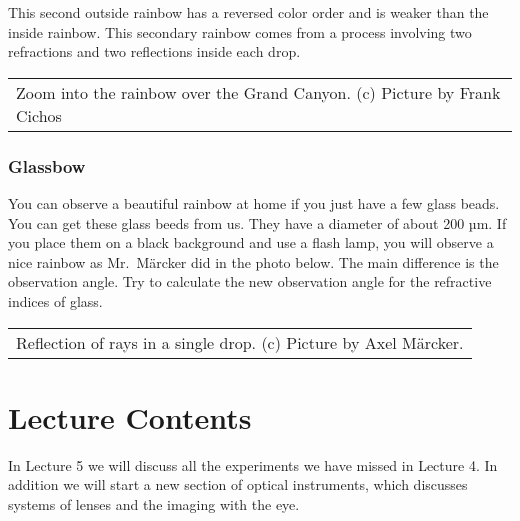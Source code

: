 \documentclass[letterpaper,10pt,english]{sphinxmanual}
\begin{document}
This second outside rainbow has a reversed color order and is weaker than the inside rainbow. This secondary rainbow comes from a process involving two refractions and two reflections inside each drop.


\begin{savenotes}\sphinxattablestart
\centering
\begin{tabulary}{\linewidth}[t]{|T|}
\hline
\sphinxstyletheadfamily 
{}
\\
\hline
{} Zoom into the rainbow over the Grand Canyon. (c) Picture by Frank Cichos
\\
\hline
\end{tabulary}
\par
\sphinxattableend\end{savenotes}


\subsubsection{Glassbow}
\label{\detokenize{notebooks/L4/Rainbow:Glassbow}}
You can observe a beautiful rainbow at home if you just have a few glass beads. You can get these glass beeds from us. They have a diameter of about 200 µm. If you place them on a black background and use a flash lamp, you will observe a nice rainbow as Mr. Märcker did in the photo below. The main difference is the observation angle. Try to calculate the new observation angle for the refractive indices of glass.


\begin{savenotes}\sphinxattablestart
\centering
\begin{tabulary}{\linewidth}[t]{|T|}
\hline
\sphinxstyletheadfamily 
{}
\\
\hline
{} Reflection of rays in a single drop. (c) Picture by Axel Märcker.
\\
\hline
\end{tabulary}
\par
\sphinxattableend\end{savenotes}


\section{Lecture Contents}
\label{\detokenize{lectures/L5/overview_5:lecture-contents}}\label{\detokenize{lectures/L5/overview_5::doc}}
In Lecture 5 we will discuss all the experiments we have missed in Lecture 4. In addition we will start a new section of optical instruments, which discusses systems of lenses and the imaging with the eye.
\end{document}
